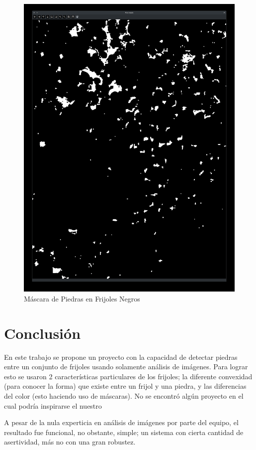 \documentclass[conference]{IEEEtran}
\begin{document}
    \begin{figure}[H]
        \centering
        \includegraphics[width=\breite\linewidth]{images/mascara_negros.png}
        \caption{Máscara de Piedras en Frijoles Negros}
        \label{fig:mascara_negros}
    \end{figure}

\section{Conclusión}
    En este trabajo se propone un proyecto con la capacidad de detectar piedras entre un conjunto de frijoles usando solamente análisis de imágenes. Para lograr esto se usaron 2 características particulares de los frijoles; la diferente convexidad (para conocer la forma) que existe entre un frijol y una piedra, y las diferencias del color (esto haciendo uso de máscaras\cite{mask}). No se encontró algún proyecto en el cual podría inspirarse el nuestro 

    A pesar de la nula experticia en análisis de imágenes por parte del equipo, el resultado fue funcional, no obstante, simple; un sistema con cierta cantidad de asertividad, más no con una gran robustez.
    

\nocite{*}
\printbibliography
\end{document}

